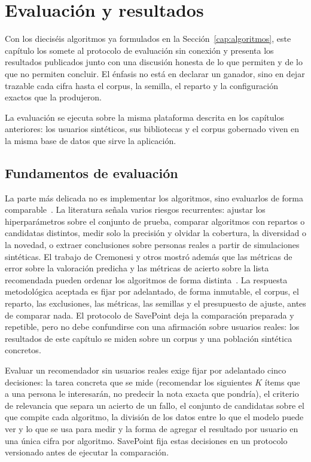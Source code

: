 \chapter{Evaluación y resultados}\label{cap:resultados}\label{cap:experimentos}

Con los dieciséis algoritmos ya formulados en la Sección~\ref{cap:algoritmos}, este capítulo los somete al protocolo de evaluación
sin conexión y presenta los resultados publicados junto con una discusión honesta de lo que permiten y de lo que no
permiten concluir. El énfasis no está en declarar un ganador, sino en dejar trazable cada cifra
hasta el corpus, la semilla, el reparto y la configuración exactos que la produjeron.

La evaluación se ejecuta sobre la misma plataforma descrita en los capítulos anteriores: los
usuarios sintéticos, sus bibliotecas y el corpus gobernado viven en la misma base de datos que
sirve la aplicación.

\section{Fundamentos de evaluación}\label{sec:exp-fundamentos}

La parte más delicada no es implementar los algoritmos, sino evaluarlos de forma
comparable~\cite{herlocker2004evaluating, gunawardana2015evaluating}. La literatura señala
varios riesgos recurrentes: ajustar los hiperparámetros sobre el conjunto de prueba, comparar
algoritmos con repartos o candidatas distintos, medir solo la precisión y olvidar la
cobertura, la diversidad o la novedad, o extraer conclusiones sobre personas reales a partir
de simulaciones sintéticas. El trabajo de Cremonesi y otros mostró además que las métricas de
error sobre la valoración predicha y las métricas de acierto sobre la lista recomendada
pueden ordenar los algoritmos de forma distinta~\cite{cremonesi2010performance}. La respuesta
metodológica aceptada es fijar por adelantado, de forma inmutable, el corpus, el reparto, las
exclusiones, las métricas, las semillas y el presupuesto de ajuste, antes de comparar nada.
El protocolo de SavePoint deja la comparación preparada y repetible, pero no debe confundirse
con una afirmación sobre usuarios reales: los resultados de este capítulo se miden sobre un
corpus y una población sintética concretos.

Evaluar un recomendador sin usuarios reales exige fijar por adelantado cinco decisiones: la
tarea concreta que se mide (recomendar los siguientes \(K\) ítems que a una persona le
interesarán, no predecir la nota exacta que pondría), el criterio de relevancia que separa un
acierto de un fallo, el conjunto de candidatas sobre el que compite cada algoritmo, la división
de los datos entre lo que el modelo puede ver y lo que se usa para medir y la forma de agregar
el resultado por usuario en una única cifra por algoritmo. SavePoint fija estas decisiones en
un protocolo versionado antes de ejecutar la comparación.

